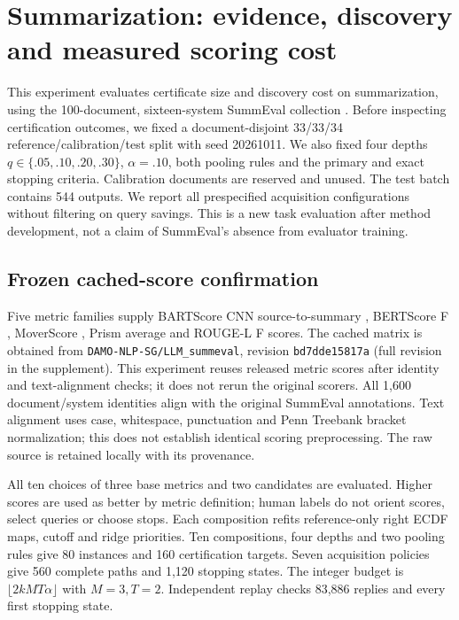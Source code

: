 \section{Summarization: evidence, discovery and measured scoring cost}
\label{app:summeval-confirmation}
This experiment evaluates certificate size and discovery cost on summarization, using the 100-document, sixteen-system SummEval collection \citep{fabbri-etal-2021-summeval}. Before inspecting certification outcomes, we fixed a document-disjoint 33/33/34 reference/calibration/test split with seed 20261011. We also fixed four depths $q\in\{.05,.10,.20,.30\}$, $\alpha=.10$, both pooling rules and the primary and exact stopping criteria. Calibration documents are reserved and unused. The test batch contains 544 outputs. We report all prespecified acquisition configurations without filtering on query savings. This is a new task evaluation after method development, not a claim of SummEval's absence from evaluator training.

\subsection{Frozen cached-score confirmation}
Five metric families supply BARTScore CNN source-to-summary \citep{yuan2021bartscore}, BERTScore F \citep{zhang2020bertscore}, MoverScore \citep{zhao-etal-2019-moverscore}, Prism average \citep{thompson-post-2020-automatic} and ROUGE-L F \citep{lin-2004-rouge} scores. The cached matrix is obtained from \texttt{DAMO-NLP-SG/LLM\_summeval}, revision \texttt{bd7dde15817a} (full revision in the supplement). This experiment reuses released metric scores after identity and text-alignment checks; it does not rerun the original scorers. All 1,600 document/system identities align with the original SummEval annotations. Text alignment uses case, whitespace, punctuation and Penn Treebank bracket normalization; this does not establish identical scoring preprocessing. The raw source is retained locally with its provenance.

All ten choices of three base metrics and two candidates are evaluated. Higher scores are used as better by metric definition; human labels do not orient scores, select queries or choose stops. Each composition refits reference-only right ECDF maps, cutoff and ridge priorities. Ten compositions, four depths and two pooling rules give 80 instances and 160 certification targets. Seven acquisition policies give 560 complete paths and 1,120 stopping states. The integer budget is $\lfloor2kMT\alpha\rfloor$ with $M=3,T=2$. Independent replay checks 83,886 replies and every first stopping state.


